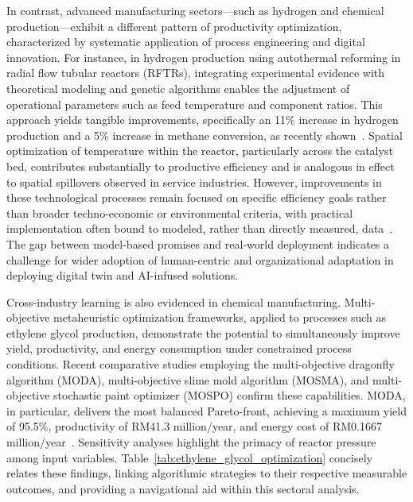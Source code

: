 \documentclass[sigconf]{acmart}
\begin{document}
In contrast, advanced manufacturing sectors—such as hydrogen and chemical production—exhibit a different pattern of productivity optimization, characterized by systematic application of process engineering and digital innovation. For instance, in hydrogen production using autothermal reforming in radial flow tubular reactors (RFTRs), integrating experimental evidence with theoretical modeling and genetic algorithms enables the adjustment of operational parameters such as feed temperature and component ratios. This approach yields tangible improvements, specifically an 11\% increase in hydrogen production and a 5\% increase in methane conversion, as recently shown~\cite{ref74}. Spatial optimization of temperature within the reactor, particularly across the catalyst bed, contributes substantially to productive efficiency and is analogous in effect to spatial spillovers observed in service industries. However, improvements in these technological processes remain focused on specific efficiency goals rather than broader techno-economic or environmental criteria, with practical implementation often bound to modeled, rather than directly measured, data~\cite{ref74}. The gap between model-based promises and real-world deployment indicates a challenge for wider adoption of human-centric and organizational adaptation in deploying digital twin and AI-infused solutions.

Cross-industry learning is also evidenced in chemical manufacturing. Multi-objective metaheuristic optimization frameworks, applied to processes such as ethylene glycol production, demonstrate the potential to simultaneously improve yield, productivity, and energy consumption under constrained process conditions. Recent comparative studies employing the multi-objective dragonfly algorithm (MODA), multi-objective slime mold algorithm (MOSMA), and multi-objective stochastic paint optimizer (MOSPO) confirm these capabilities. MODA, in particular, delivers the most balanced Pareto-front, achieving a maximum yield of 95.5\%, productivity of RM41.3 million/year, and energy cost of RM0.1667 million/year~\cite{ref75}. Sensitivity analyses highlight the primacy of reactor pressure among input variables. Table~\ref{tab:ethylene_glycol_optimization} concisely relates these findings, linking algorithmic strategies to their respective measurable outcomes, and providing a navigational aid within this sectoral analysis.
\end{document}
